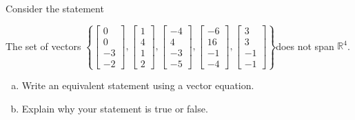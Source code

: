 
\begin{exerciseStatement}


Consider the statement 
\begin{center}\begin{minipage}{0.8\textwidth}
 The set of vectors \( \left\{ \left[\begin{array}{c}
0 \\
0 \\
-3 \\
-2
\end{array}\right] , \left[\begin{array}{c}
1 \\
4 \\
1 \\
2
\end{array}\right] , \left[\begin{array}{c}
-4 \\
4 \\
-3 \\
-5
\end{array}\right] , \left[\begin{array}{c}
-6 \\
16 \\
-1 \\
-4
\end{array}\right] , \left[\begin{array}{c}
3 \\
3 \\
-1 \\
-1
\end{array}\right] \right\} \)does not span \(\mathbb{R}^4\). 
\end{minipage}\end{center}
    


\begin{enumerate}[(a)]
\item  Write an equivalent statement using a vector equation.
\item  Explain why your statement is true or false.
\end{enumerate}
    
\end{exerciseStatement}
    
